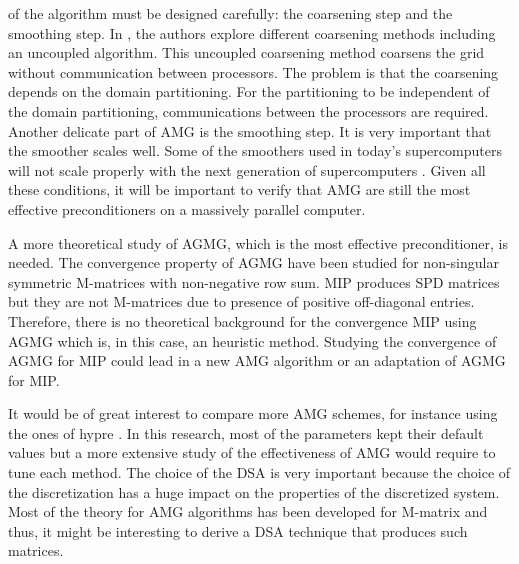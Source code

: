 \begin{long_description}
    of the algorithm must be designed carefully: the coarsening step and the
    smoothing step. In \cite{mis}, the authors explore different coarsening
    methods including an uncoupled algorithm. This uncoupled coarsening method
    coarsens the grid without communication between processors. The problem
    is that the coarsening depends on the domain partitioning. For the
    partitioning to be independent of the domain partitioning, communications
    between the processors are required. Another delicate part of AMG is the
    smoothing step. It is very important that the smoother scales well. Some
    of the smoothers used in today's supercomputers will not scale properly
    with the next generation of supercomputers \cite{amg_parallel}. Given all
    these conditions, it will be important to verify that AMG are still the
    most effective preconditioners on a massively parallel computer.
  \item[Convergence study of AGMG for MIP and development of AMG for MIP:] A 
    more theoretical study of AGMG, which is the most effective preconditioner, 
    is needed. The convergence property of AGMG have been studied for non-singular 
    symmetric M-matrices with non-negative row sum. MIP produces SPD matrices
    but they are not M-matrices due to presence of positive off-diagonal
    entries. Therefore, there is no theoretical background for the convergence 
    MIP using AGMG which is, in this case, an heuristic method. Studying the 
    convergence of AGMG for MIP could lead in a new AMG algorithm or an adaptation 
    of AGMG for MIP.
  \item[Comparison of different AMG methods:] It would be of great interest 
    to compare more AMG schemes, for instance using the ones of hypre 
    \cite{hypre_guide}. In this research, most of the parameters kept their 
    default values but a more extensive study of the effectiveness of AMG 
    would require to tune each method. The choice of the DSA is very important 
    because the choice of the discretization has a huge impact on the properties 
    of the discretized system. Most of the theory for AMG algorithms has been 
    developed for M-matrix and thus, it might be interesting to derive a DSA
    technique that produces such matrices.
\end{long_description}
